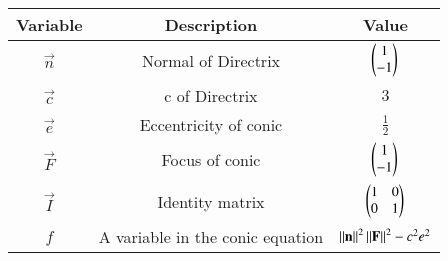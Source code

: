 \begin{tabular}[12pt]{ |c| c| c|}
    \hline
    \textbf{Variable} & \textbf{Description} & \textbf{Value}\\
	\hline
	$\vec{n}$ &Normal of Directrix& $\begin{pmatrix}1 \\ -1\end{pmatrix} $\\
	\hline
	$\vec{c}$ & c of Directrix& $ 3$\\
	\hline
	$\vec{e}$ & Eccentricity of conic & $\frac{1}{2}$\\
	\hline
	$\vec{F}$ & Focus of conic &  $\begin{pmatrix}1 \\ -1\end{pmatrix}$ \\
	\hline
	$\vec{I}$ & Identity matrix &  $\begin{pmatrix}1 & 0 \\ 0 & 1\end{pmatrix}$\\
	\hline
	$f$ & A variable in the conic equation& $\left\lVert\mathbf{n}\right\rVert^2\left\lVert\mathbf{F}\right\rVert^2-c^2e^2$ \\
	\hline
\end{tabular}
